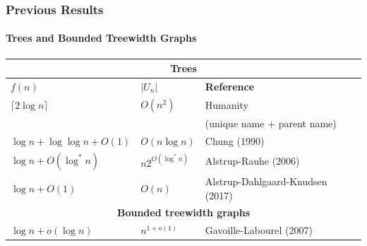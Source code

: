 \documentclass[xcolor=dvipsnames]{beamer}
\begin{document}
\begin{frame}
    \frametitle{Previous Results}
    \framesubtitle{Trees and Bounded Treewidth Graphs}

    \begin{center}
        \begin{tabular}{@{}lll@{}} \hline
            \multicolumn{3}{|c|}{\textbf{Trees}} \\ \hline
            \boldmath $f(n)$ & \boldmath $|U_n|$ & \textbf{Reference}  \\ \hline
            {$\lceil 2\log n\rceil$} & $O(n^2)$ & Humanity \\
            & & (unique name + parent name)   \\\hline
            {$\log n+\log\log n+O(1)$} & $O(n\log n)$ & Chung (1990)   \\
            $\log n + O(\log^* n)$ & $n2^{O(\log^* n)}$ & Alstrup-Rauhe (2006) \\
            {$\log n + O(1)$} & $O(n)$ & Alstrup-Dahlgaard-Knudsen (2017) \\[2em] \hline
            \multicolumn{3}{|c|}{\textbf{Bounded treewidth graphs}} \\ \hline
            {$\log n + o(\log n)$} & $n^{1+o(1)}$ & Gavoille-Labourel (2007)
        \end{tabular}
    \end{center}
\end{frame}
\end{document}
